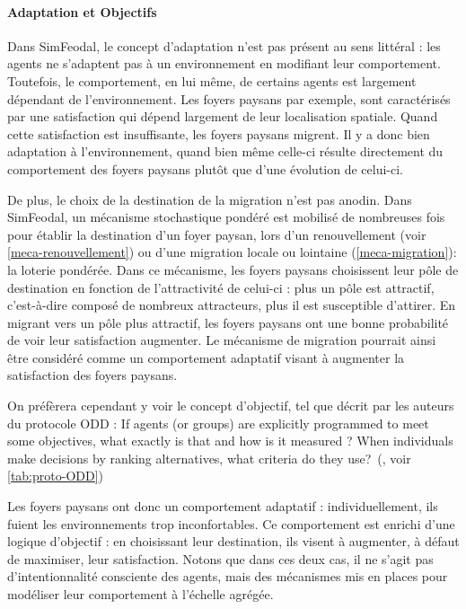 \paragraph{Adaptation et Objectifs} Dans SimFeodal, le concept d'adaptation n'est pas présent au sens littéral : les agents ne s'adaptent pas à un environnement en modifiant leur comportement.
Toutefois, le comportement, en lui même, de certains agents est largement dépendant de l'environnement.
Les foyers paysans par exemple, sont caractérisés par une satisfaction qui dépend largement de leur localisation spatiale.
Quand cette satisfaction est insuffisante, les foyers paysans migrent.
Il y a donc bien adaptation à l'environnement, quand bien même celle-ci résulte directement du comportement des foyers paysans plutôt que d'une évolution de celui-ci.

De plus, le choix de la destination de la migration n'est pas anodin.
Dans SimFeodal, un mécanisme stochastique pondéré est mobilisé de nombreuses fois pour établir la destination d'un foyer paysan, lors d'un renouvellement (voir \cref{meca-renouvellement}) ou d'une migration locale ou lointaine (\cref{meca-migration}): la \og loterie pondérée\fg{}.
Dans ce mécanisme, les foyers paysans \og choisissent\fg{} leur pôle de destination en fonction de l'attractivité de celui-ci :
plus un pôle est attractif, c'est-à-dire composé de nombreux attracteurs, plus il est susceptible d'attirer.
En migrant vers un pôle plus attractif, les foyers paysans ont une bonne probabilité de voir leur satisfaction augmenter.
Le mécanisme de migration pourrait ainsi être considéré comme un comportement adaptatif visant à augmenter la satisfaction des foyers paysans.

On préfèrera cependant y voir le concept d'\og objectif\fg{}, tel que décrit par les auteurs du protocole ODD : \og If agents (or groups) are explicitly programmed to meet some objectives, what exactly is that and how is it measured ? When individuals make decisions by ranking alternatives, what criteria do they use?\fg{}~(\textcite[353]{grimm_documenting_2017}, voir \cref{tab:proto-ODD})

Les foyers paysans ont donc un comportement adaptatif : individuellement, ils fuient les environnements trop inconfortables.
Ce comportement est enrichi d'une logique d'objectif : en choisissant leur destination, ils visent à augmenter, à défaut de maximiser, leur satisfaction.
Notons que dans ces deux cas, il ne s'agit pas d'intentionnalité consciente des agents, mais des mécanismes mis en places pour modéliser leur comportement à l'échelle agrégée.


